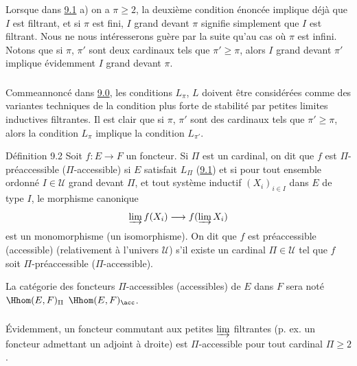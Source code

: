 \setcounter{subsection}{1}
\subsubsection{}
Lorsque dans \hyperref[I.def9.1]{9.1} a) on a $\pi \geq 2$, la deuxième condition
énoncée
implique déjà que $I$ est filtrant, et si $\pi$ est fini, $I$ grand
devant $\pi$ signifie simplement que $I$ est filtrant. Nous ne nous
intéresserons guère par la suite qu'au cas où $\pi$ est infini.
Notons que si $\pi$, $\pi'$ sont deux cardinaux tels que $\pi'\geq
\pi$, alors $I$ grand devant $\pi'$ implique évidemment $I$ grand
devant $\pi$.

\subsubsection{}
Comme\pageoriginale annoncé dans \hyperref[I.sec9.0]{9.0}, les conditions
$L_{\pi}$, $L$
doivent être considérées comme des variantes techniques de la
condition plus forte de stabilité par petites limites inductives
filtrantes. Il est clair que si $\pi$, $\pi'$ sont des cardinaux
tels que $\pi'\geq \pi$, alors la condition $L_{\pi}$ implique la
condition $L_{\pi'}$.

\begin{enonce*}{Définition 9.2}
Soit $f:E\rightarrow F$ un foncteur. Si $\Pi$ est un cardinal, on
dit que $f$ est $\Pi$-préaccessible (\resp $\Pi$-accessible) si $E$
satisfait $L_{\Pi}$ (\hyperref[I.def9.1]{9.1}) et si pour tout ensemble ordonné $I\in
𝒰$ grand devant $\Pi$, et tout système inductif $(X_i)_{i\in
I}$ dans $E$ de type $I$, le morphisme canonique
$$
\varinjlim f(X_i)\longrightarrow f(\varinjlim X_i)
$$
est un monomorphisme (\resp un isomorphisme). On dit que $f$ est
préaccessible \\ (\resp accessible) (relativement à l'univers
$𝒰$) s'il existe un cardinal $\Pi\in 𝒰$ tel que $f$
soit $\Pi$-préaccessible (\resp $\Pi$-accessible).
\end{enonce*}

La catégorie des foncteurs $\Pi$-accessibles (\resp accessibles) de
$E$ dans $F$ sera noté $\Hhom(E,F)_{\Pi}$ \resp $\Hhom(E,F)_{\acc}$.

\setcounter{subsection}{2} \setcounter{subsubsection}{0}
\subsubsection{}
Évidemment, un foncteur commutant aux petites $\varinjlim$
filtrantes (p. ex. un foncteur admettant un adjoint à droite) est
$\Pi$-accessible pour tout cardinal $\Pi\geq 2$.

